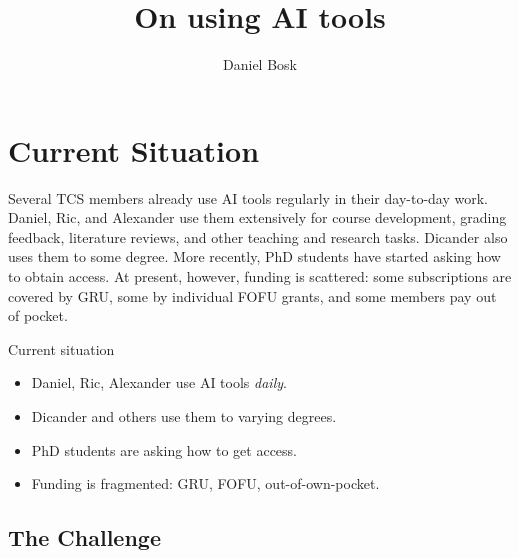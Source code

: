 \title{On using AI tools}
\author{Daniel Bosk}

\mode*

\begin{frame}
  \maketitle
\end{frame}

\begin{abstract}
  
\end{abstract}

\begin{frame}
\end{frame}


\section{Current Situation}

Several TCS members already use AI tools regularly in their day-to-day work.
Daniel, Ric, and Alexander use them extensively for course development, grading feedback,
literature reviews, and other teaching and research tasks.
Dicander also uses them to some degree.
More recently, PhD students have started asking how to obtain access.
At present, however, funding is scattered: some subscriptions are covered by GRU, some by
individual FOFU grants, and some members pay out of pocket.

\begin{frame}
  \begin{block}{Current situation}
    \begin{itemize}
      \item Daniel, Ric, Alexander use AI tools \emph{daily}.
      \item Dicander and others use them to varying degrees.
      \item PhD students are asking how to get access.
      \item Funding is fragmented: GRU, FOFU, out-of-own-pocket.
    \end{itemize}
  \end{block}
\end{frame}


\subsection{The Challenge}

